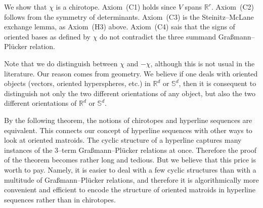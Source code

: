 \documentclass[a4paper]{amsart}
\newcommand{\p}{\mathbb S}
\theoremstyle{definition}
\theoremstyle{remark}
\begin{document}
We show that $\chi$ is a chirotope. Axiom~(C1) holds since $V$ spans
$\mathbb R^{r}$. Axiom~(C2) follows from the symmetry of
determinants. 
Axiom~(C3) is the Steinitz--McLane exchange lemma, as Axiom~(H3)
above. Axiom~(C4) sais that the signs of oriented bases as defined by
$\chi$ do not contradict the three summand Gra{\ss}mann--Pl\"ucker
relation.  

Note that we do distinguish between $\chi$ and $-\chi$,
although this is not usual in the literature. Our reason comes from
geometry. We believe if one deals with oriented objects (vectors,
oriented hyperspheres, etc.) in $\mathbb R^d$ or $\p^d$, then it is
consequent to distinguish not only the two different orientations of any
object, but also the two different orientations of $\mathbb R^d$ or
$\p^d$.

By the following theorem, the notions of chirotopes and hyperline
sequences are equivalent. This connects our concept
of hyperline sequences with other ways to look at oriented matroids.
%
The cyclic structure of a hyperline captures many instances of the
$3$--term Gra{\ss}mann--Pl\"ucker relations at once.  Therefore the
proof of the theorem becomes rather long and tedious.  But we
believe that this price is worth to pay.
%
Namely, it is easier to deal with a few cyclic structures than with a
multitude of Gra{\ss}mann--Pl\"ucker relations, and therefore it is
algorithmically more convenient and efficient to encode the structure of
oriented matroids in hyperline sequences rather than in chirotopes.
\end{document}
